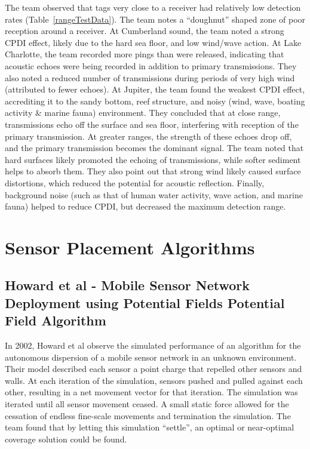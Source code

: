 The team observed that tags very close to a receiver had relatively low detection rates (Table~\ref{rangeTestData}).  The team notes a ``doughnut'' shaped zone of poor reception around a receiver.  At Cumberland sound, the team noted a strong CPDI effect, likely due to the hard sea floor, and low wind/wave action.  At Lake Charlotte, the team recorded more pings than were released, indicating that acoustic echoes were being recorded in addition to primary transmissions.   They also noted a reduced number of transmissions during periods of very high wind (attributed to fewer echoes).  At Jupiter, the team found the weakest CPDI effect, accrediting it to the sandy bottom, reef structure, and noisy (wind, wave, boating activity \& marine fauna) environment.  They concluded that at close range, transmissions echo off the surface and sea floor, interfering with reception of the primary transmission.  At greater ranges, the strength of these echoes drop off, and the primary transmission becomes the dominant signal.  The team noted that hard surfaces likely promoted the echoing of transmissions, while softer sediment helps to absorb them.  They also point out that strong wind likely caused surface distortions, which reduced the potential for acoustic reflection.  Finally, background noise (such as that of human water activity, wave action, and marine fauna) helped to reduce CPDI, but decreased the maximum detection range.


\section{Sensor Placement Algorithms}
\subsection{Howard et al - Mobile Sensor Network Deployment using Potential Fields Potential Field Algorithm}
In 2002, Howard et al observe the simulated performance of an algorithm for the autonomous dispersion of a mobile sensor network in an unknown environment.  Their model described each sensor a point charge that repelled other sensors and walls.  At each iteration of the simulation, sensors pushed and pulled against each other, resulting in a net movement vector for that iteration.  The simulation was iterated until all sensor movement ceased.  A small static force allowed for the cessation of endless fine-scale movements and termination the simulation.  The team found that by letting this simulation ``settle'', an optimal or near-optimal coverage solution could be found.  


